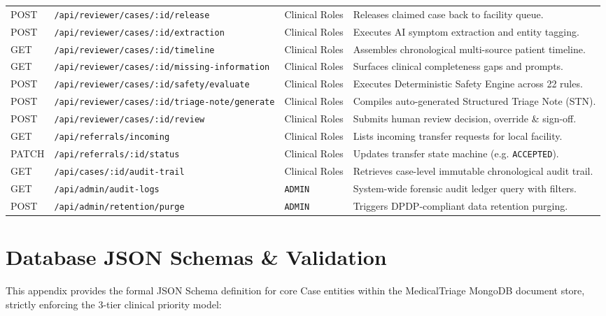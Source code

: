 \documentclass[11pt,a4paper,oneside]{report}
\begin{document}
\begin{longtable}{llp{2.6cm}p{4.8cm}}
  POST & \texttt{/api/reviewer/cases/:id/release} & Clinical Roles & Releases claimed case back to facility queue. \\
  POST & \texttt{/api/reviewer/cases/:id/extraction} & Clinical Roles & Executes AI symptom extraction and entity tagging. \\
  GET & \texttt{/api/reviewer/cases/:id/timeline} & Clinical Roles & Assembles chronological multi-source patient timeline. \\
  GET & \texttt{/api/reviewer/cases/:id/missing-information} & Clinical Roles & Surfaces clinical completeness gaps and prompts. \\
  POST & \texttt{/api/reviewer/cases/:id/safety/evaluate} & Clinical Roles & Executes Deterministic Safety Engine across 22 rules. \\
  POST & \texttt{/api/reviewer/cases/:id/triage-note/generate} & Clinical Roles & Compiles auto-generated Structured Triage Note (STN). \\
  POST & \texttt{/api/reviewer/cases/:id/review} & Clinical Roles & Submits human review decision, override \& sign-off. \\
  \addlinespace
  GET & \texttt{/api/referrals/incoming} & Clinical Roles & Lists incoming transfer requests for local facility. \\
  PATCH & \texttt{/api/referrals/:id/status} & Clinical Roles & Updates transfer state machine (e.g. \texttt{ACCEPTED}). \\
  \addlinespace
  GET & \texttt{/api/cases/:id/audit-trail} & Clinical Roles & Retrieves case-level immutable chronological audit trail. \\
  GET & \texttt{/api/admin/audit-logs} & \texttt{ADMIN} & System-wide forensic audit ledger query with filters. \\
  POST & \texttt{/api/admin/retention/purge} & \texttt{ADMIN} & Triggers DPDP-compliant data retention purging. \\
\end{longtable}

\chapter{Database JSON Schemas \& Validation}

This appendix provides the formal JSON Schema definition for core Case entities within the MedicalTriage MongoDB document store, strictly enforcing the 3-tier clinical priority model:
\end{document}
